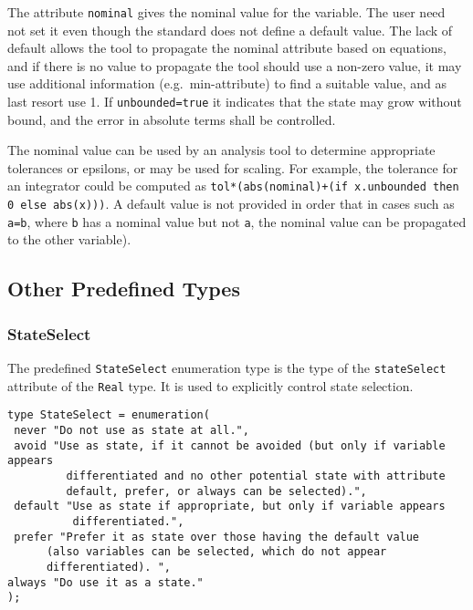The attribute \lstinline!nominal! gives the nominal value for the variable. The user
need not set it even though the standard does not define a default
value. The lack of default allows the tool to propagate the nominal
attribute based on equations, and if there is no value to propagate the
tool should use a non-zero value, it may use additional information
(e.g.\ min-attribute) to find a suitable value, and as last resort use 1.
If \lstinline!unbounded=true! it indicates that the state may grow without
bound, and the error in absolute terms shall be controlled.

\begin{nonnormative}
The nominal value can be used by an analysis tool to determine appropriate tolerances or epsilons, or may be used for scaling. For example,
the tolerance for an integrator could be computed as \lstinline!tol*(abs(nominal)+(if x.unbounded then 0 else abs(x)))!.  A default value
is not provided in order that in cases such as \lstinline!a=b!, where \lstinline!b! has a nominal value but not \lstinline!a!, the nominal
value can be propagated to the other variable).
\end{nonnormative}


\subsection{Other Predefined Types}\label{other-predefined-types}

\subsubsection{StateSelect}\label{stateselect}

The predefined \lstinline!StateSelect! enumeration type is the type of the
\lstinline!stateSelect! attribute of the \lstinline!Real! type. It is used to explicitly control
state selection.

\begin{lstlisting}[language=modelica]
type StateSelect = enumeration(
 never "Do not use as state at all.",
 avoid "Use as state, if it cannot be avoided (but only if variable appears
         differentiated and no other potential state with attribute
         default, prefer, or always can be selected).",
 default "Use as state if appropriate, but only if variable appears
          differentiated.",
 prefer "Prefer it as state over those having the default value
      (also variables can be selected, which do not appear
      differentiated). ",
always "Do use it as a state."
);
\end{lstlisting}

